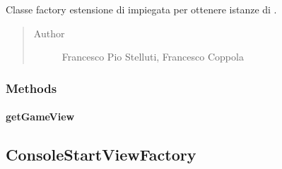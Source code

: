 \documentclass[letterpaper,10pt,italian,openany,oneside]{sphinxmanual}
\begin{document}
\begin{fulllineitems}
\label{\detokenize{source/it/unicam/cs/pa/mastermind/factories/ConsoleGameViewFactory:it.unicam.cs.pa.mastermind.factories.ConsoleGameViewFactory}}
Classe factory estensione di  impiegata per ottenere istanze di .
\begin{quote}\begin{description}
\item[{Author}] \leavevmode
Francesco Pio Stelluti, Francesco Coppola

\end{description}\end{quote}

\end{fulllineitems}



\subsubsection{Methods}
\label{\detokenize{source/it/unicam/cs/pa/mastermind/factories/ConsoleGameViewFactory:methods}}

\paragraph{getGameView}
\label{\detokenize{source/it/unicam/cs/pa/mastermind/factories/ConsoleGameViewFactory:getgameview}}

\begin{fulllineitems}
\label{\detokenize{source/it/unicam/cs/pa/mastermind/factories/ConsoleGameViewFactory:it.unicam.cs.pa.mastermind.factories.ConsoleGameViewFactory.getGameView()}}
\end{fulllineitems}



\subsection{ConsoleStartViewFactory}
\label{\detokenize{source/it/unicam/cs/pa/mastermind/factories/ConsoleStartViewFactory:consolestartviewfactory}}\label{\detokenize{source/it/unicam/cs/pa/mastermind/factories/ConsoleStartViewFactory::doc}}
\end{document}
